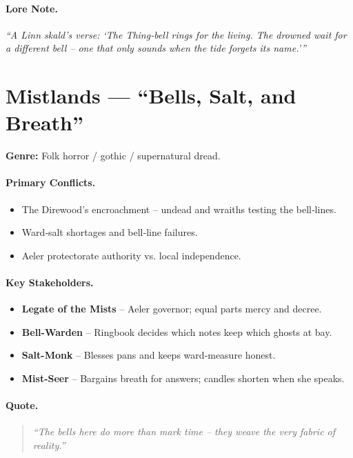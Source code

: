 \paragraph{Lore Note.}
\emph{“A Linn skald’s verse: ‘The Thing‑bell rings for the living. The drowned wait for a different bell – one that only sounds when the tide forgets its name.’”}

\section{Mistlands — “Bells, Salt, and Breath”}
\textbf{Genre:} Folk horror / gothic / supernatural dread.

\paragraph{Primary Conflicts.}
\begin{itemize}
  \item The Direwood’s encroachment – undead and wraiths testing the bell‑lines.
  \item Ward‑salt shortages and bell‑line failures.
  \item Aeler protectorate authority vs. local independence.
\end{itemize}

\paragraph{Key Stakeholders.}
\begin{itemize}
  \item \textbf{Legate of the Mists} – Aeler governor; equal parts mercy and decree.
  \item \textbf{Bell-Warden} – Ringbook decides which notes keep which ghosts at bay.
  \item \textbf{Salt-Monk} – Blesses pans and keeps ward‑measure honest.
  \item \textbf{Mist-Seer} – Bargains breath for answers; candles shorten when she speaks.
\end{itemize}

\paragraph{Quote.}
\begin{quote}
\emph{“The bells here do more than mark time – they weave the very fabric of reality.”}
\end{quote}

